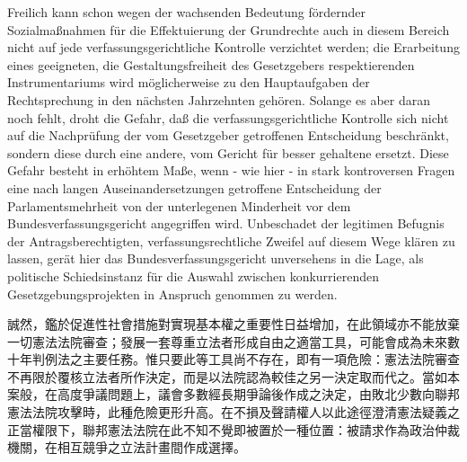 \documentclass[12pt]{article}
\begin{document}
\syncleft
\begin{sourcepara}
Freilich kann schon wegen der wachsenden Bedeutung fördernder Sozialmaßnahmen für die Effektuierung der Grundrechte auch in diesem Bereich nicht auf jede verfassungsgerichtliche Kontrolle verzichtet werden; die Erarbeitung eines geeigneten, die Gestaltungsfreiheit des Gesetzgebers respektierenden Instrumentariums wird möglicherweise zu den Hauptaufgaben der Rechtsprechung in den nächsten Jahrzehnten gehören. Solange es aber daran noch fehlt, droht die Gefahr, daß die verfassungsgerichtliche Kontrolle sich nicht auf die Nachprüfung der vom Gesetzgeber getroffenen Entscheidung beschränkt, sondern diese durch eine andere, vom Gericht für besser gehaltene ersetzt. Diese Gefahr besteht in erhöhtem Maße, wenn - wie hier - in stark kontroversen Fragen eine nach langen Auseinandersetzungen getroffene Entscheidung der Parlamentsmehrheit von der unterlegenen Minderheit vor dem Bundesverfassungsgericht angegriffen wird. Unbeschadet der legitimen Befugnis der Antragsberechtigten, verfassungsrechtliche Zweifel auf diesem Wege klären zu lassen, gerät hier das Bundesverfassungsgericht unversehens in die Lage, als politische Schiedsinstanz für die Auswahl zwischen konkurrierenden Gesetzgebungsprojekten in Anspruch genommen zu werden.
\end{sourcepara}
\begin{transpara}
誠然，鑑於促進性社會措施對實現基本權之重要性日益增加，在此領域亦不能放棄一切憲法法院審查；發展一套尊重立法者形成自由之適當工具，可能會成為未來數十年判例法之主要任務。惟只要此等工具尚不存在，即有一項危險：憲法法院審查不再限於覆核立法者所作決定，而是以法院認為較佳之另一決定取而代之。當如本案般，在高度爭議問題上，議會多數經長期爭論後作成之決定，由敗北少數向聯邦憲法法院攻擊時，此種危險更形升高。在不損及聲請權人以此途徑澄清憲法疑義之正當權限下，聯邦憲法法院在此不知不覺即被置於一種位置：被請求作為政治仲裁機關，在相互競爭之立法計畫間作成選擇。
\end{transpara}
\end{document}
